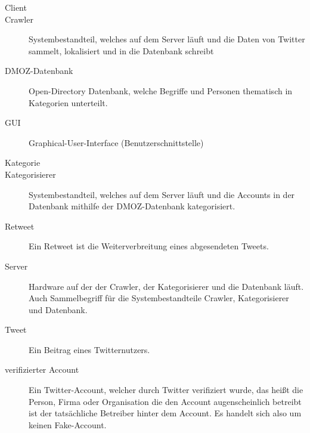 
\begin{description}
	\item[Client]
	\item[Crawler] Systembestandteil, welches auf dem Server läuft und die Daten von Twitter sammelt, lokalisiert und in die Datenbank schreibt
	\item [DMOZ-Datenbank] Open-Directory Datenbank, welche Begriffe und Personen thematisch in Kategorien unterteilt.
	\item[GUI] Graphical-User-Interface (Benutzerschnittstelle)
	\item[Kategorie]
	\item[Kategorisierer] Systembestandteil, welches auf dem Server läuft und die Accounts in der Datenbank mithilfe der DMOZ-Datenbank kategorisiert.
	\item[Retweet] Ein Retweet ist die Weiterverbreitung eines abgesendeten Tweets.
	\item[Server] Hardware auf der der Crawler, der Kategorisierer und die Datenbank läuft. Auch Sammelbegriff für die Systembestandteile Crawler, Kategorisierer und Datenbank.
	\item[Tweet] Ein Beitrag eines Twitternutzers.
	\item[verifizierter Account] Ein Twitter-Account, welcher durch Twitter verifiziert wurde, das heißt die Person, Firma oder Organisation die den Account augenscheinlich betreibt ist der tatsächliche Betreiber hinter dem Account. Es handelt sich also um keinen Fake-Account.
\end{description}
